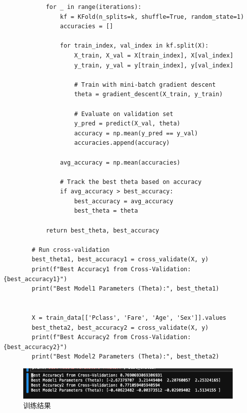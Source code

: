 \documentclass[12pt,a4paper,oneside]{article}
\begin{document}
\begin{lstlisting}
            for _ in range(iterations):
                kf = KFold(n_splits=k, shuffle=True, random_state=1)
                accuracies = []
        
                for train_index, val_index in kf.split(X):
                    X_train, X_val = X[train_index], X[val_index]
                    y_train, y_val = y[train_index], y[val_index]
                    
                    # Train with mini-batch gradient descent
                    theta = gradient_descent(X_train, y_train)
                    
                    # Evaluate on validation set
                    y_pred = predict(X_val, theta)
                    accuracy = np.mean(y_pred == y_val)
                    accuracies.append(accuracy)
        
                avg_accuracy = np.mean(accuracies)
                
                # Track the best theta based on accuracy
                if avg_accuracy > best_accuracy:
                    best_accuracy = avg_accuracy
                    best_theta = theta
                    
            return best_theta, best_accuracy
        
        # Run cross-validation
        best_theta1, best_accuracy1 = cross_validate(X, y)
        print(f"Best Accuracy1 from Cross-Validation: {best_accuracy1}")
        print("Best Model1 Parameters (Theta):", best_theta1)
        
        
        X = train_data[['Pclass', 'Fare', 'Age', 'Sex']].values
        best_theta2, best_accuracy2 = cross_validate(X, y)
        print(f"Best Accuracy2 from Cross-Validation: {best_accuracy2}")
        print("Best Model2 Parameters (Theta):", best_theta2)
    \end{lstlisting}
    \begin{figure}[H]
        \centering
        \begin{minipage}{0.7\textwidth}
            \centering
            \includegraphics[width=\textwidth]{image/5} %
            \caption{训练结果}
            \label{fig:image5}
        \end{minipage}
    \end{figure}
\end{document}
